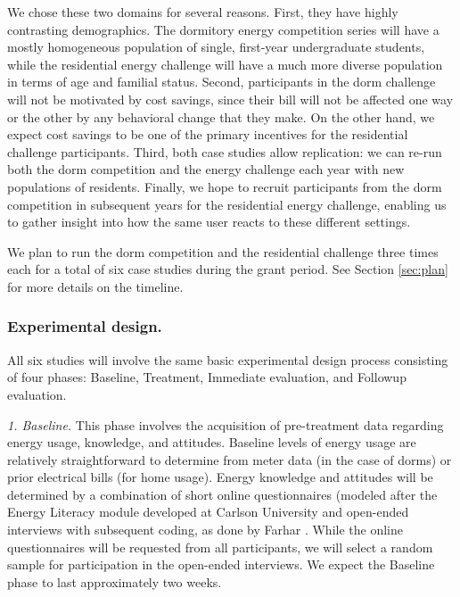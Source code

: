 We chose these two domains for several reasons. First, they have highly
contrasting demographics.  The dormitory energy competition series will
have a mostly homogeneous population of single, first-year undergraduate
students, while the residential energy challenge will have a much more
diverse population in terms of age and familial status.  Second,
participants in the dorm challenge will not be motivated by cost savings,
since their bill will not be affected one way or the other by any
behavioral change that they make. On the other hand, we expect cost savings
to be one of the primary incentives for the residential challenge
participants.  Third, both case studies allow replication: we can re-run
both the dorm competition and the energy challenge each year with new
populations of residents.  Finally, we hope to recruit participants from
the dorm competition in subsequent years for the residential energy
challenge, enabling us to gather insight into how the same user reacts to
these different settings. 

We plan to run the dorm competition and the residential challenge three
times each for a total of six case studies during the grant period.  See
Section \ref{sec:plan} for more details on the timeline.

\subsubsection{Experimental design.}

All six studies will involve the same basic experimental design process
consisting of four phases: Baseline, Treatment, Immediate evaluation, and
Followup evaluation.

{\em 1. Baseline.}  This phase involves the acquisition of
pre-treatment data regarding energy usage, knowledge, and attitudes.
Baseline levels of energy usage are relatively straightforward to determine
from meter data (in the case of dorms) or prior electrical bills (for home
usage).  Energy knowledge and attitudes will be determined by a combination
of short online questionnaires (modeled after the Energy Literacy module
developed at Carlson University \cite{DeWaters09,DeWaters09b} and
open-ended interviews with subsequent coding, as done by Farhar
\cite{Farhar09}. While the online questionnaires will be requested from all
participants, we will select a random sample for participation in the
open-ended interviews.  We expect the Baseline phase to last approximately
two weeks. 

